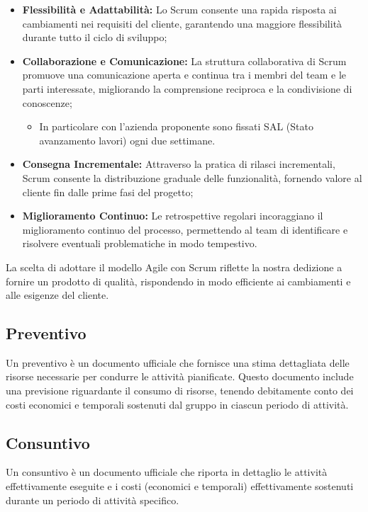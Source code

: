 \documentclass{article}
\begin{document}
\begin{itemize}
    \item \textbf{Flessibilità e Adattabilità:} Lo Scrum consente una rapida risposta ai cambiamenti nei requisiti del cliente, garantendo una maggiore flessibilità durante tutto il ciclo di sviluppo;
    \item \textbf{Collaborazione e Comunicazione:} La struttura collaborativa di Scrum promuove una comunicazione aperta e continua tra i membri del team e le parti interessate, migliorando la comprensione reciproca e la condivisione di conoscenze;
          \begin{itemize}
              \item In particolare con l'azienda proponente sono fissati SAL (Stato avanzamento lavori) ogni due settimane.
          \end{itemize}
    \item \textbf{Consegna Incrementale:} Attraverso la pratica di rilasci incrementali, Scrum consente la distribuzione graduale delle funzionalità, fornendo valore al cliente fin dalle prime fasi del progetto;
    \item \textbf{Miglioramento Continuo:} Le retrospettive regolari incoraggiano il miglioramento continuo del processo, permettendo al team di identificare e risolvere eventuali problematiche in modo tempestivo.
\end{itemize}

La scelta di adottare il modello Agile con Scrum riflette la nostra dedizione a fornire un prodotto di qualità, rispondendo in modo efficiente ai cambiamenti e alle esigenze del cliente.

\subsection{Preventivo}
Un preventivo è un documento ufficiale che fornisce una stima dettagliata delle risorse necessarie per condurre le attività pianificate. Questo documento include una previsione riguardante il consumo di risorse, tenendo debitamente conto dei costi economici e temporali sostenuti dal gruppo in ciascun periodo di attività.
\subsection{Consuntivo}
Un consuntivo è un documento ufficiale che riporta in dettaglio le attività effettivamente eseguite e i costi (economici e temporali) effettivamente sostenuti durante un periodo di attività specifico.
\end{document}

